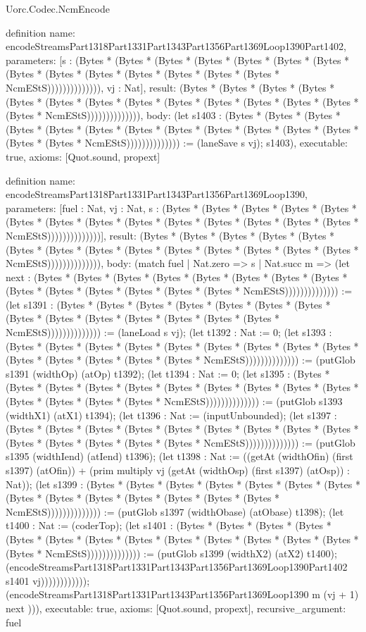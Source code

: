 \begin{lexlean}{Uorc.Codec.NcmEncode}
\begin{semanticmodule}
definition{
  name: encodeStreamsPart1318Part1331Part1343Part1356Part1369Loop1390Part1402,
  parameters: [s : (Bytes * (Bytes * (Bytes * (Bytes * (Bytes * (Bytes * (Bytes * (Bytes * (Bytes * (Bytes * (Bytes * (Bytes * (Bytes * (Bytes * NcmEStS)))))))))))))), vj : Nat],
  result: (Bytes * (Bytes * (Bytes * (Bytes * (Bytes * (Bytes * (Bytes * (Bytes * (Bytes * (Bytes * (Bytes * (Bytes * (Bytes * (Bytes * NcmEStS)))))))))))))),
  body: (let s1403 : (Bytes * (Bytes * (Bytes * (Bytes * (Bytes * (Bytes * (Bytes * (Bytes * (Bytes * (Bytes * (Bytes * (Bytes * (Bytes * (Bytes * NcmEStS)))))))))))))) := (laneSave s vj); s1403),
  executable: true,
  axioms: [Quot.sound, propext]
}

definition{
  name: encodeStreamsPart1318Part1331Part1343Part1356Part1369Loop1390,
  parameters: [fuel : Nat, vj : Nat, s : (Bytes * (Bytes * (Bytes * (Bytes * (Bytes * (Bytes * (Bytes * (Bytes * (Bytes * (Bytes * (Bytes * (Bytes * (Bytes * (Bytes * NcmEStS))))))))))))))],
  result: (Bytes * (Bytes * (Bytes * (Bytes * (Bytes * (Bytes * (Bytes * (Bytes * (Bytes * (Bytes * (Bytes * (Bytes * (Bytes * (Bytes * NcmEStS)))))))))))))),
  body: (match fuel
    | Nat.zero => s
    | Nat.succ m => (let next : (Bytes * (Bytes * (Bytes * (Bytes * (Bytes * (Bytes * (Bytes * (Bytes * (Bytes * (Bytes * (Bytes * (Bytes * (Bytes * (Bytes * NcmEStS)))))))))))))) := (let s1391 : (Bytes * (Bytes * (Bytes * (Bytes * (Bytes * (Bytes * (Bytes * (Bytes * (Bytes * (Bytes * (Bytes * (Bytes * (Bytes * (Bytes * NcmEStS)))))))))))))) := (laneLoad s vj); (let t1392 : Nat := 0; (let s1393 : (Bytes * (Bytes * (Bytes * (Bytes * (Bytes * (Bytes * (Bytes * (Bytes * (Bytes * (Bytes * (Bytes * (Bytes * (Bytes * (Bytes * NcmEStS)))))))))))))) := (putGlob s1391 (widthOp) (atOp) t1392); (let t1394 : Nat := 0; (let s1395 : (Bytes * (Bytes * (Bytes * (Bytes * (Bytes * (Bytes * (Bytes * (Bytes * (Bytes * (Bytes * (Bytes * (Bytes * (Bytes * (Bytes * NcmEStS)))))))))))))) := (putGlob s1393 (widthX1) (atX1) t1394); (let t1396 : Nat := (inputUnbounded); (let s1397 : (Bytes * (Bytes * (Bytes * (Bytes * (Bytes * (Bytes * (Bytes * (Bytes * (Bytes * (Bytes * (Bytes * (Bytes * (Bytes * (Bytes * NcmEStS)))))))))))))) := (putGlob s1395 (widthIend) (atIend) t1396); (let t1398 : Nat := ((getAt (widthOfin) (first s1397) (atOfin)) + (prim multiply vj (getAt (widthOsp) (first s1397) (atOsp)) : Nat)); (let s1399 : (Bytes * (Bytes * (Bytes * (Bytes * (Bytes * (Bytes * (Bytes * (Bytes * (Bytes * (Bytes * (Bytes * (Bytes * (Bytes * (Bytes * NcmEStS)))))))))))))) := (putGlob s1397 (widthObase) (atObase) t1398); (let t1400 : Nat := (coderTop); (let s1401 : (Bytes * (Bytes * (Bytes * (Bytes * (Bytes * (Bytes * (Bytes * (Bytes * (Bytes * (Bytes * (Bytes * (Bytes * (Bytes * (Bytes * NcmEStS)))))))))))))) := (putGlob s1399 (widthX2) (atX2) t1400); (encodeStreamsPart1318Part1331Part1343Part1356Part1369Loop1390Part1402 s1401 vj)))))))))))); (encodeStreamsPart1318Part1331Part1343Part1356Part1369Loop1390 m (vj + 1) next ))),
  executable: true,
  axioms: [Quot.sound, propext],
  recursive_argument: fuel
}


\end{semanticmodule}
\end{lexlean}
